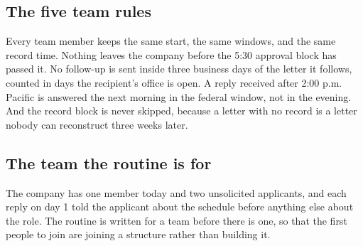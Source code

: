 \subsection{The five team rules}

Every team member keeps the same start, the same windows, and the same record
time. Nothing leaves the company before the 5:30 approval block has passed it. No
follow-up is sent inside three business days of the letter it follows, counted in
days the recipient's office is open. A reply received after 2:00 p.m. Pacific is
answered the next morning in the federal window, not in the evening. And the
record block is never skipped, because a letter with no record is a letter
nobody can reconstruct three weeks later.

\subsection{The team the routine is for}

The company has one member today and two unsolicited applicants, and each reply
on day 1 told the applicant about the schedule before anything else about the
role. The routine is written for a team before there is one, so that the first
people to join are joining a structure rather than building it.

